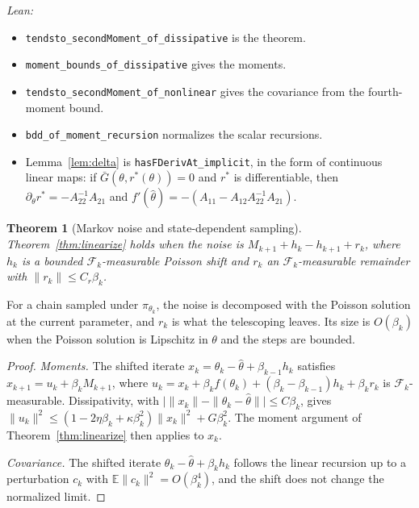 \documentclass[11pt]{article}
\newtheorem{theorem}{Theorem}[section]
\theoremstyle{definition}
\theoremstyle{remark}
\newcommand{\E}{\mathbb{E}}
\begin{document}
\noindent\emph{Lean:}
\begin{itemize}
\item \texttt{tendsto\_secondMoment\_of\_dissipative} is the theorem.
\item \texttt{moment\_bounds\_of\_dissipative} gives the moments.
\item \texttt{tendsto\_secondMoment\_of\_nonlinear} gives the covariance from the fourth-moment bound.
\item \texttt{bdd\_of\_moment\_recursion} normalizes the scalar recursions.
\item Lemma~\ref{lem:delta} is \texttt{hasFDerivAt\_implicit}, in the form of continuous linear maps:
  if $\bar G(\theta, r^*(\theta)) = 0$ and $r^*$ is differentiable, then $\partial_\theta r^* = -A_{22}^{-1}A_{21}$ and
  $f'(\hat\theta) = -(A_{11} - A_{12}A_{22}^{-1}A_{21})$.
\end{itemize}

\begin{theorem}[Markov noise and state-dependent sampling]\label{thm:linmarkov}
Theorem~\ref{thm:linearize} holds when the noise is $M_{k+1} + h_k - h_{k+1} + r_k$, where $h_k$ is a bounded
$\mathcal F_k$-measurable Poisson shift and $r_k$ an $\mathcal F_k$-measurable remainder with $\|r_k\| \le C_r\beta_k$.
\end{theorem}
For a chain sampled under $\pi_{\theta_k}$, the noise is decomposed with the Poisson solution at the current
parameter, and $r_k$ is what the telescoping leaves. Its size is $O(\beta_k)$ when the Poisson solution is
Lipschitz in $\theta$ and the steps are bounded.
\begin{proof}
\emph{Moments.} The shifted iterate $x_k = \theta_k - \hat\theta + \beta_{k-1}h_k$ satisfies
$x_{k+1} = u_k + \beta_kM_{k+1}$, where
$u_k = x_k + \beta_kf(\theta_k) + (\beta_k - \beta_{k-1})h_k + \beta_kr_k$ is $\mathcal F_k$-measurable. Dissipativity, with
$\big|\|x_k\| - \|\theta_k - \hat\theta\|\big| \le C\beta_k$, gives
$\|u_k\|^2 \le (1 - 2\eta\beta_k + \kappa\beta_k^2)\|x_k\|^2 + G\beta_k^2$. The moment argument of
Theorem~\ref{thm:linearize} then applies to $x_k$.

\emph{Covariance.} The shifted iterate $\theta_k - \hat\theta + \beta_kh_k$ follows the linear recursion up to a
perturbation $c_k$ with $\E\|c_k\|^2 = O(\beta_k^4)$, and the shift does not change the normalized limit.
\end{proof}
\end{document}
